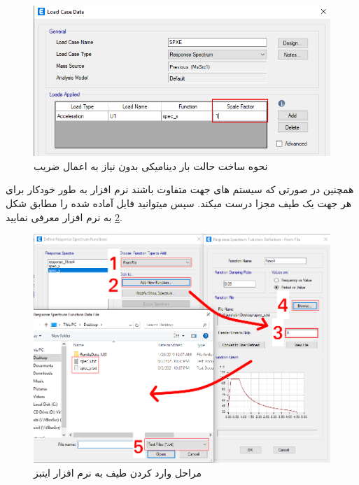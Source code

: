 \begin{figure}[H]
    \centering
    \includegraphics[scale=.7]{figures/spec_scale.png}
    \caption{نحوه ساخت حالت بار دینامیکی بدون نیاز به اعمال ضریب}
    \label{pic:spec_scale}
\end{figure}

همچنین در صورتی که سیستم های جهت 
متفاوت باشند نرم افزار به طور خودکار برای هر جهت یک طیف مجزا درست میکند. سپس میتوانید فایل آماده شده را مطابق شکل
\ref{pic:spec}
به نرم افزار معرفی نمایید.

\begin{figure}[H]
    \centering
    \includegraphics[scale=.6]{figures/spec}
    \caption{مراحل وارد کردن طیف به نرم افزار ایتبز}
    \label{pic:spec}
\end{figure}

